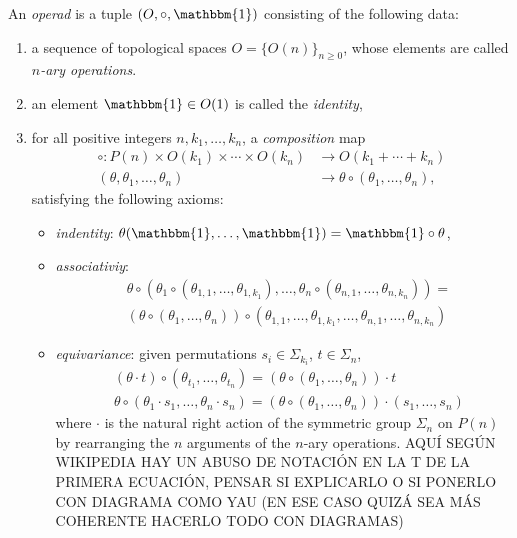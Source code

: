 \documentclass[TFM.tex]{subfiles}
\begin{document}
%
\begin{defi}
An \emph{operad} is a tuple $(O, \circ, \mathbbm{1})$ consisting of the following data:
\begin{enumerate}[(1)]
\item a sequence of topological spaces $O=\{O(n)\}_{n\geq 0}$, whose elements are called \emph{$n$-ary operations}.
\item an element $\mathbbm{1}\in O(1)$ is called the \emph{identity},
\item for all positive integers $n,k_1,\dots, k_n$, a \emph{composition} map
\begin{align*}
\circ:P(n)\times O(k_1)\times\cdots\times O(k_n)&\to O(k_1+\cdots+k_n)\\
(\theta, \theta_1,\dots, \theta_n)&\to \theta\circ(\theta_1,\dots, \theta_n),
\end{align*}
satisfying the following axioms:
\begin{itemize}
\item \emph{indentity}: $\theta(\mathbbm{1},\dots, \mathbbm{1})=\mathbbm{1}\circ\theta$,
\item \emph{associativiy}:
\begin{align*}
& \theta \circ (\theta_1 \circ (\theta_{1,1}, \ldots, \theta_{1,k_1}), \ldots, \theta_n \circ (\theta_{n,1}, \ldots,\theta_{n,k_n}))= \\
 {} & (\theta \circ (\theta_1, \ldots, \theta_n)) \circ (\theta_{1,1}, \ldots, \theta_{1,k_1}, \ldots, \theta_{n,1}, \ldots, \theta_{n,k_n})
\end{align*}

\item \emph{equivariance}: given permutations $s_i\in\Sigma_{k_i}$, $t\in\Sigma_n$,
\begin{align*}
& (\theta\cdot t)\circ(\theta_{t_1},\ldots,\theta_{t_n}) = (\theta\circ(\theta_1,\ldots,\theta_n))\cdot t \\[2pt]
& \theta\circ(\theta_1\cdot s_1,\ldots,\theta_n\cdot s_n) = (\theta\circ(\theta_1,\ldots,\theta_n))\cdot (s_1,\ldots,s_n)
\end{align*}
where $\cdot$ is the natural right action of the symmetric group $\Sigma_n$ on $P(n)$ by rearranging the $n$ arguments of the $n$-ary operations. AQUÍ SEGÚN WIKIPEDIA HAY UN ABUSO DE NOTACIÓN EN LA T DE LA PRIMERA ECUACIÓN, PENSAR SI EXPLICARLO O SI PONERLO CON DIAGRAMA COMO YAU (EN ESE CASO QUIZÁ SEA MÁS COHERENTE HACERLO TODO CON DIAGRAMAS)
\end{itemize}
\end{enumerate}
\end{defi}
\end{document}
